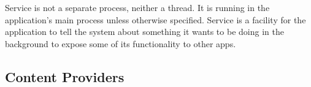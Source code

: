 
Service is not a separate process, neither a thread. It is running in the
application's main process unless otherwise specified. Service is a facility for
the application to tell the system about something it wants to be doing in the
background to expose some of its functionality to other apps.


\subsection{Content Providers}








  




